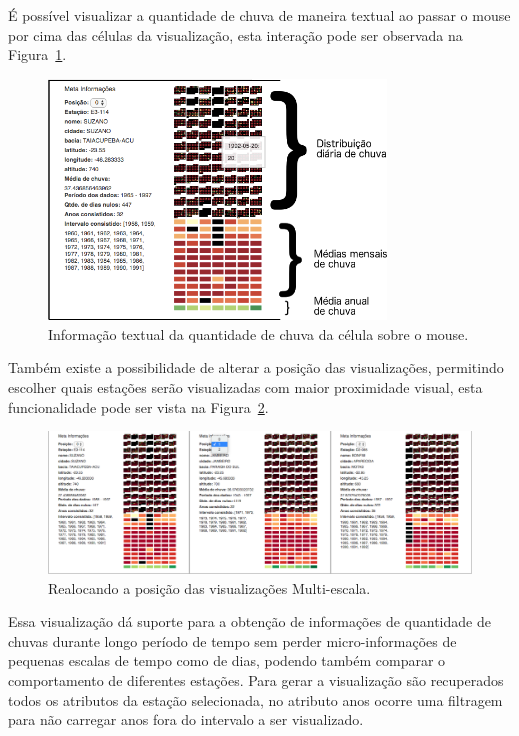 \documentclass[article,11pt,oneside,a4paper]{abntex2} %
\begin{document}
	É possível visualizar a quantidade de chuva de maneira textual ao passar o mouse por cima das células da visualização, esta interação pode ser observada na Figura~\ref{multi_tool}.
	
	\begin{figure}[!h]
		\centering
		\includegraphics[width=0.8\textwidth]{figuras/multi_tool1}
		\caption{Informação textual da quantidade de chuva da célula sobre o mouse.}
		\label{multi_tool}
	\end{figure}

	Também existe a possibilidade de alterar a posição das visualizações, permitindo escolher quais estações serão visualizadas com maior proximidade visual, esta funcionalidade pode ser vista na Figura~\ref{multi_ord}.
	
	\begin{figure}[!htb]
		\centering
		\includegraphics[width=1\textwidth]{figuras/multi_ord}
		\caption{Realocando a posição das visualizações Multi-escala.}
		\label{multi_ord}
	\end{figure}
	
	Essa visualização dá suporte para a obtenção de informações de quantidade de chuvas durante longo período de tempo sem perder micro-informações de pequenas escalas de tempo como de dias, podendo também comparar o comportamento de diferentes estações. Para gerar a visualização são recuperados todos os atributos da estação selecionada, no atributo anos ocorre uma filtragem para não carregar anos fora do intervalo a ser visualizado.
	
\end{document}
